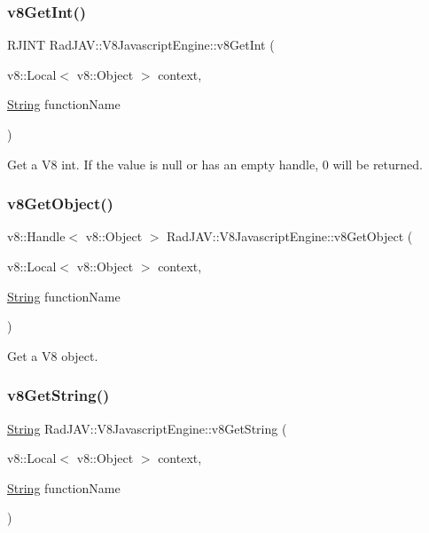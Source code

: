 \subsubsection{\texorpdfstring{v8\+Get\+Int()}{v8GetInt()}}
{\footnotesize\ttfamily R\+J\+I\+NT Rad\+J\+A\+V\+::\+V8\+Javascript\+Engine\+::v8\+Get\+Int (\begin{DoxyParamCaption}\item[{v8\+::\+Local$<$ v8\+::\+Object $>$}]{context,  }\item[{\mbox{\hyperlink{class_rad_j_a_v_1_1_string}{String}}}]{function\+Name }\end{DoxyParamCaption})}



Get a V8 int. If the value is null or has an empty handle, 0 will be returned. 

\mbox{\label{class_rad_j_a_v_1_1_v8_javascript_engine_a2dd95ba66026d628daaf579cca1b0504}} 
\subsubsection{\texorpdfstring{v8\+Get\+Object()}{v8GetObject()}}
{\footnotesize\ttfamily v8\+::\+Handle$<$ v8\+::\+Object $>$ Rad\+J\+A\+V\+::\+V8\+Javascript\+Engine\+::v8\+Get\+Object (\begin{DoxyParamCaption}\item[{v8\+::\+Local$<$ v8\+::\+Object $>$}]{context,  }\item[{\mbox{\hyperlink{class_rad_j_a_v_1_1_string}{String}}}]{function\+Name }\end{DoxyParamCaption})}



Get a V8 object. 

\mbox{\label{class_rad_j_a_v_1_1_v8_javascript_engine_a7a92772c801855c5af4dd2afb5dbadca}} 
\subsubsection{\texorpdfstring{v8\+Get\+String()}{v8GetString()}}
{\footnotesize\ttfamily \mbox{\hyperlink{class_rad_j_a_v_1_1_string}{String}} Rad\+J\+A\+V\+::\+V8\+Javascript\+Engine\+::v8\+Get\+String (\begin{DoxyParamCaption}\item[{v8\+::\+Local$<$ v8\+::\+Object $>$}]{context,  }\item[{\mbox{\hyperlink{class_rad_j_a_v_1_1_string}{String}}}]{function\+Name }\end{DoxyParamCaption})}



